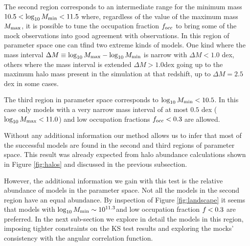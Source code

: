 \documentclass[usenatbib]{mn2e}
\newcommand{\hMsun}{{\ifmmode{h^{-1}{\rm
        {M_{\odot}}}}\else{$h^{-1}{\rm{M_{\odot}}}$}\fi}}
\begin{document}
The second region corresponds to an intermediate range for the minimum
mass $10.5<\log_{10}M_{\rm min}<11.5$ where, regardless of the value of
the maximum mass $M_{\rm max}$, it is possible to tune the occupation
fraction $f_{\rm occ}$ to bring some of the mock observations into
good agreement with observations. In this region of parameter space
one can tfind two extreme kinds of models.  One kind where the
mass interval $\Delta M\equiv \log_{10} M_{\rm max} - \log_{10}M_{\rm
  min}$ is narrow with $\Delta M<1.0$ dex, others where the mass interval is 
extended $\Delta M>1.0$dex going up to the maximum halo mass
present in the simulation at that redshift, up to $\Delta M = 2.5$ dex
in some cases.  
 
The third region in parameter space corresponds to $\log_{10}M_{\rm
  min}<10.5$. In this case only models with a very narrow mass interval of
at most $0.5$ dex ($\log_{10}M_{\rm max}<11.0$) and low
occupation fractions $f_{\rm occ}<0.3$ are allowed. 

Without any additional information our method allows us to infer that
most of the successful models are found in the second and third regions of
parameter space. This result was already expected from halo
abundance calculations shown in Figure \ref{fig:halos} and discussed
in the previous subsection. 

However, the additional information we gain with this test is the
relative abundance of models in the parameter space. Not all the
models in the second region have an equal abundance. By inspection of
Figure \ref{fig:landscape} it seems that models with $\log_{10}M_{\rm
  min}\sim 10^{11.3}$\hMsun and low occupation fraction $f_{\rm}<0.3$
are preferred.  In the next sub-section we explore in detail the
models in this region, imposing tighter constraints on the KS test
results and exploring the mocks' consistency with the angular correlation
function.  
\end{document}
